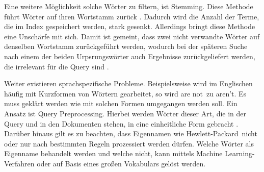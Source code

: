 Eine weitere Möglichkeit solche Wörter zu filtern, ist \glqq Stemming\grqq .
Diese Methode führt Wörter auf ihren Wortstamm zurück \cite{IR_Intro_Cambridge} \cite{IR_Uni_Bamberg}. Dadurch wird die Anzahl der Terme, die im Index gespeichert werden, stark gesenkt. Allerdings bringt diese Methode eine Unschärfe mit sich. Damit ist gemeint, dass zwei nicht verwandte Wörter auf denselben Wortstamm zurückgeführt werden, wodurch bei der späteren Suche nach einem der beiden Urpsrungswörter auch Ergebnisse zurückgeliefert werden, die irrelevant für die Query sind \cite{IR_Intro_Cambridge}.

Weiter existieren sprachspezifische Probleme. Beispielsweise wird im Englischen häufig mit Kurzformen von Wörtern gearbeitet, so wird \glqq are not\grqq\ zu \glqq aren't\grqq. Es muss geklärt werden wie mit solchen Formen umgegangen werden soll. Ein Ansatz ist Query Preprocessing. Hierbei werden Wörter dieser Art, die in der Query und in den Dokumenten stehen, in eine einheitliche Form gebracht \cite{IR_Intro_Cambridge}. Darüber hinaus gilt es zu beachten, dass Eigennamen wie \glqq Hewlett-Packard\grqq\ nicht oder nur nach bestimmten Regeln prozessiert werden dürfen. Welche Wörter als Eigenname behandelt werden und welche nicht, kann mittels Machine Learning-Verfahren oder auf Basis eines großen Vokabulars gelöst werden.